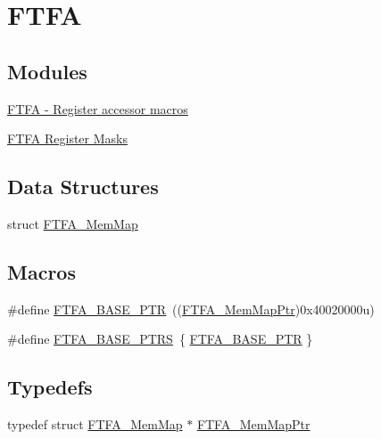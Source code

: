 \hypertarget{group___f_t_f_a___peripheral}{}\section{F\+T\+FA}
\label{group___f_t_f_a___peripheral}
\subsection*{Modules}
\begin{DoxyCompactItemize}
\item 
\hyperlink{group___f_t_f_a___register___accessor___macros}{F\+T\+F\+A -\/ Register accessor macros}
\item 
\hyperlink{group___f_t_f_a___register___masks}{F\+T\+F\+A Register Masks}
\end{DoxyCompactItemize}
\subsection*{Data Structures}
\begin{DoxyCompactItemize}
\item 
struct \hyperlink{struct_f_t_f_a___mem_map}{F\+T\+F\+A\+\_\+\+Mem\+Map}
\end{DoxyCompactItemize}
\subsection*{Macros}
\begin{DoxyCompactItemize}
\item 
\#define \hyperlink{group___f_t_f_a___peripheral_ga13ad52f12d5b04e5e01f69ab18ed9216}{F\+T\+F\+A\+\_\+\+B\+A\+S\+E\+\_\+\+P\+TR}~((\hyperlink{group___f_t_f_a___peripheral_ga49d048bbeb55a090a5ecfe86ff767884}{F\+T\+F\+A\+\_\+\+Mem\+Map\+Ptr})0x40020000u)
\item 
\#define \hyperlink{group___f_t_f_a___peripheral_ga3f06770a713a2c02c4eec6b98daefd7e}{F\+T\+F\+A\+\_\+\+B\+A\+S\+E\+\_\+\+P\+T\+RS}~\{ \hyperlink{group___f_t_f_a___peripheral_ga13ad52f12d5b04e5e01f69ab18ed9216}{F\+T\+F\+A\+\_\+\+B\+A\+S\+E\+\_\+\+P\+TR} \}
\end{DoxyCompactItemize}
\subsection*{Typedefs}
\begin{DoxyCompactItemize}
\item 
typedef struct \hyperlink{struct_f_t_f_a___mem_map}{F\+T\+F\+A\+\_\+\+Mem\+Map} $\ast$ \hyperlink{group___f_t_f_a___peripheral_ga49d048bbeb55a090a5ecfe86ff767884}{F\+T\+F\+A\+\_\+\+Mem\+Map\+Ptr}
\end{DoxyCompactItemize}


